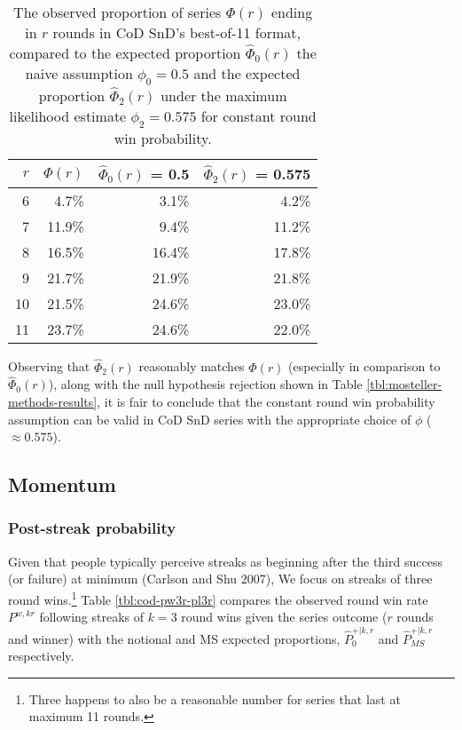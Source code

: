 \documentclass{article}
\begin{document}
\begin{longtable}[]{@{}rrrr@{}}
\caption{The observed proportion of series $\Phi(r)$ ending in $r$ rounds in CoD SnD's best-of-11 format, compared to the expected proportion $\hat{\Phi}_0(r)$ the naive assumption $\phi_0 = 0.5$ and the expected proportion $\hat{\Phi}_2(r)$ under the maximum likelihood estimate $\phi_2 = 0.575$ for constant round win probability.}\label{tbl:expected-series-lengths-alternative-ps} \\
\toprule()
$r$ & $\Phi(r)$ & $\hat{\Phi}_0(r)$ = 0.5 & $\hat{\Phi}_2(r)$ = 0.575 \\
\midrule()
\endhead
6 & 4.7\% & 3.1\% & 4.2\% \\
7 & 11.9\% & 9.4\% & 11.2\% \\
8 & 16.5\% & 16.4\% & 17.8\% \\
9 & 21.7\% & 21.9\% & 21.8\% \\
10 & 21.5\% & 24.6\% & 23.0\% \\
11 & 23.7\% & 24.6\% & 22.0\% \\
\bottomrule()
\end{longtable}

Observing that \(\hat{\Phi}_2(r)\) reasonably matches \(\Phi(r)\)
(especially in comparison to \(\hat{\Phi}_0(r)\)), along with the null
hypothesis rejection shown in Table \ref{tbl:mosteller-methods-results},
it is fair to conclude that the constant round win probability
assumption can be valid in CoD SnD series with the appropriate choice of
\(\phi\) (\(\approx 0.575\)).

\hypertarget{momentum-1}{%
\subsection{Momentum}\label{momentum-1}}

\hypertarget{post-streak-probability}{%
\subsubsection{Post-streak probability}\label{post-streak-probability}}

Given that people typically perceive streaks as beginning after the
third success (or failure) at minimum (Carlson and Shu 2007), We focus
on streaks of three round wins.\footnote{Three happens to also be a
  reasonable number for series that last at maximum 11 rounds.} Table
\ref{tbl:cod-pw3r-pl3r} compares the observed round win rate
\(P^{w,kr}\) following streaks of \(k=3\) round wins given the series
outcome (\(r\) rounds and winner) with the notional and MS expected
proportions, \(\hat{P}^{+|k,r}_0\) and \(\hat{P}^{+|k,r}_{MS}\)
respectively.
\end{document}
